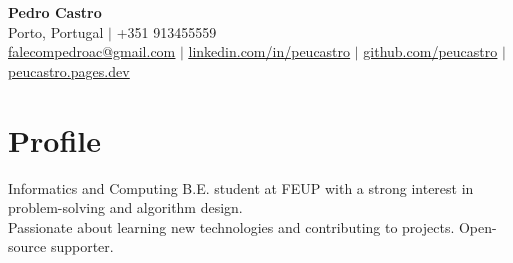 






\begin{center}
  \textbf{\Huge Pedro Castro} \\ \vspace{6pt}
  \faMapMarker*{} \small{Porto, Portugal} $|$ \faPhone{} +351
  913455559 \\ \vspace{2pt}
  \faEnvelope{}
  \href{mailto:falecompedroac@gmail.com}{\underline{falecompedroac@gmail.com}}
  $|$
  \faLinkedin{}
  \href{https://linkedin.com/in/peucastro}{\underline{linkedin.com/in/peucastro}}
  $|$
  \faGithub{}
  \href{https://github.com/peucastro}{\underline{github.com/peucastro}} $|$
  \faGlobe{}
  \href{https://peucastro.pages.dev/}{\underline{peucastro.pages.dev}}
\end{center}

\section{Profile}
\begin{itemize}[leftmargin=0.15in, label={}]
    \small{
    \item{
        Informatics and Computing B.E. student at FEUP with a strong
        interest in problem-solving and algorithm design. \\
        Passionate about learning new technologies and contributing
        to projects. Open-source supporter.
    }}
\end{itemize}

